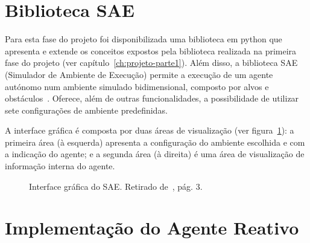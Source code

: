 \section{Biblioteca SAE}\label{sec:biblioteca-sae}

Para esta fase do projeto foi disponibilizada uma biblioteca em python que apresenta e extende os conceitos expostos pela biblioteca realizada na primeira fase do projeto (ver capítulo~\ref{ch:projeto-parte1}).
Além disso, a biblioteca SAE (Simulador de Ambiente de Execução) permite a execução de um agente autónomo num ambiente simulado bidimensional, composto por alvos e obstáculos~\cite{isel:iasa:slides:sae-documentacao}.
Oferece, além de outras funcionalidades, a possibilidade de utilizar sete configurações de ambiente predefinidas.

A interface gráfica é composta por duas áreas de visualização (ver figura~\ref{fig:sae-interface-grafica}): a primeira área (à esquerda) apresenta a configuração do ambiente escolhida e com a indicação do agente; e a segunda área (à direita) é uma área de visualização de informação interna do agente.

\begin{figure}[H]
    \begin{center}
    \end{center}
    \caption{Interface gráfica do SAE.
    Retirado de~\cite{isel:iasa:slides:sae-documentacao}, pág.
    3.}\label{fig:sae-interface-grafica}
\end{figure}


\section{Implementação do Agente Reativo}\label{sec:implementacao-agente-reativo}

